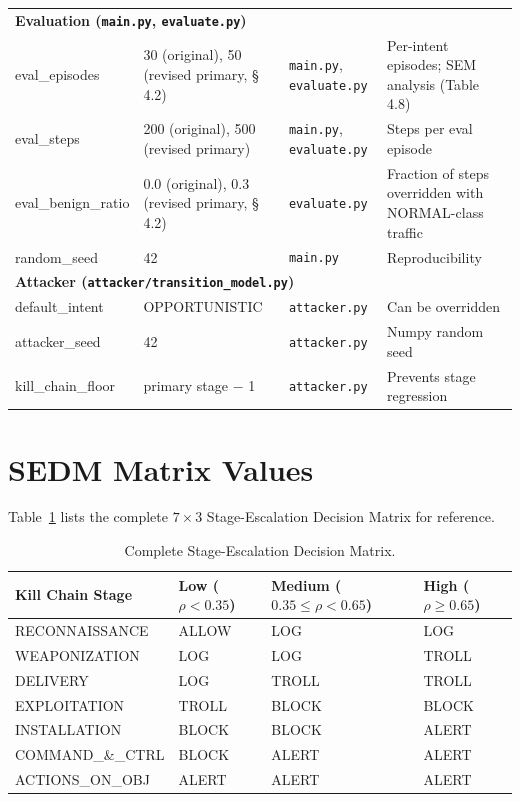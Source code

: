\begin{longtable}{p{3.8cm}p{2.6cm}p{3.5cm}p{3.2cm}}
  \multicolumn{4}{l}{\textbf{Evaluation (\texttt{main.py}, \texttt{evaluate.py})}} \\[3pt]
  eval\_episodes     & 30 (original), 50 (revised primary, \S\,4.2) & \texttt{main.py}, \texttt{evaluate.py} & Per-intent episodes; SEM analysis (Table 4.8) \\
  eval\_steps        & 200 (original), 500 (revised primary) & \texttt{main.py}, \texttt{evaluate.py} & Steps per eval episode \\
  eval\_benign\_ratio & 0.0 (original), 0.3 (revised primary, \S\,4.2) & \texttt{evaluate.py} & Fraction of steps overridden with NORMAL-class traffic \\
  random\_seed       & 42          & \texttt{main.py}     & Reproducibility \\[6pt]

  \multicolumn{4}{l}{\textbf{Attacker (\texttt{attacker/transition\_model.py})}} \\[3pt]
  default\_intent    & OPPORTUNISTIC & \texttt{attacker.py} & Can be overridden \\
  attacker\_seed     & 42          & \texttt{attacker.py} & Numpy random seed \\
  kill\_chain\_floor & primary stage $-$ 1 & \texttt{attacker.py} & Prevents stage regression \\
\end{longtable}

\section{SEDM Matrix Values}

Table~\ref{tab:sedm_full} lists the complete $7 \times 3$ Stage-Escalation
Decision Matrix for reference.

\begin{table}[ht]
  \centering
  \caption{Complete Stage-Escalation Decision Matrix.}
  \label{tab:sedm_full}
  \begin{tabular}{lp{2.2cm}p{2.2cm}p{2.2cm}}
    \toprule
    Kill Chain Stage & Low ($\rho < 0.35$) & Medium ($0.35 \leq \rho < 0.65$) & High ($\rho \geq 0.65$) \\
    \midrule
    RECONNAISSANCE   & ALLOW & LOG   & LOG   \\
    WEAPONIZATION    & LOG   & LOG   & TROLL \\
    DELIVERY         & LOG   & TROLL & TROLL \\
    EXPLOITATION     & TROLL & BLOCK & BLOCK \\
    INSTALLATION     & BLOCK & BLOCK & ALERT \\
    COMMAND\_\&\_CTRL & BLOCK & ALERT & ALERT \\
    ACTIONS\_ON\_OBJ & ALERT & ALERT & ALERT \\
    \bottomrule
  \end{tabular}
\end{table}

